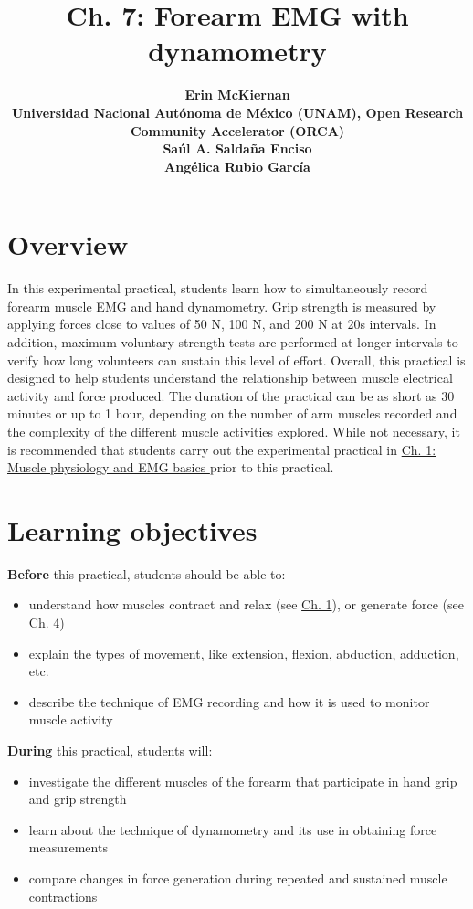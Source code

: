 \documentclass{article}
\title{Ch. 7: Forearm EMG with dynamometry}
\date{\displaydate{articleDate}}
\author{\bfseries Erin McKiernan\mdseries\\Universidad Nacional Autónoma de México (UNAM), Open Research Community Accelerator (ORCA)\\\AND\bfseries Saúl A. Saldaña Enciso\mdseries\\\AND\bfseries Angélica Rubio García\mdseries\\}
\begin{document}
\maketitle
\keywords{}

\section{Overview}

In this experimental practical, students learn how to simultaneously record forearm muscle EMG and hand dynamometry. Grip strength is measured by applying forces close to values of 50 N, 100 N, and 200 N at 20s intervals. In addition, maximum voluntary strength tests are performed at longer intervals to verify how long volunteers can sustain this level of effort. Overall, this practical is designed to help students understand the relationship between muscle electrical activity and force produced. The duration of the practical can be as short as 30 minutes or up to 1 hour, depending on the number of arm muscles recorded and the complexity of the different muscle activities explored. While not necessary, it is recommended that students carry out the experimental practical in \href{https://curvenote.com/oxa:EPpXta8zJdzN048lz8AR/hZTnTYzQR5EQmCKX51Wj}{Ch. 1: Muscle physiology and EMG basics }prior to this practical.

\section{Learning objectives}

\textbf{Before} this practical, students should be able to:

\begin{itemize}
\item understand how muscles contract and relax (see \href{https://curvenote.com/oxa:EPpXta8zJdzN048lz8AR/hZTnTYzQR5EQmCKX51Wj}{Ch. 1}), or generate force (see \href{https://curvenote.com/oxa:EPpXta8zJdzN048lz8AR/oZzZ9YkLDYhuIWC3d5Sk}{Ch. 4})
\item explain the types of movement, like extension, flexion, abduction, adduction, etc.
\item describe the technique of EMG recording and how it is used to monitor muscle activity
\end{itemize}

\textbf{During} this practical, students will:

\begin{itemize}
\item investigate the different muscles of the forearm that participate in hand grip and grip strength
\item learn about the technique of dynamometry and its use in obtaining force measurements
\item compare changes in force generation during repeated and sustained muscle contractions
\end{itemize}
\end{document}

